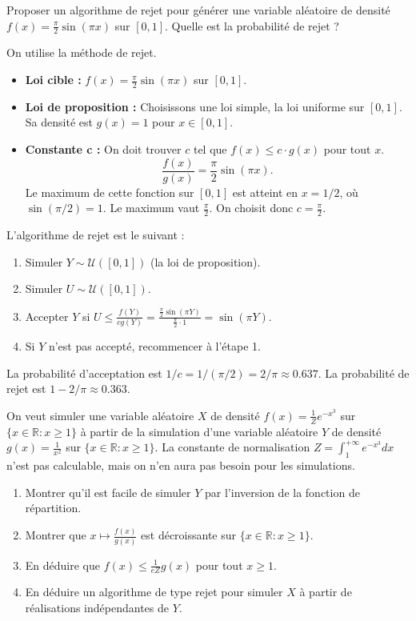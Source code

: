\documentclass[solutions]{exercices}
\begin{document}
\begin{exercice}
Proposer un algorithme de rejet pour générer une variable aléatoire de densité $f(x)=\frac{\pi}{2}\sin(\pi x)$ sur $[0,1]$.  Quelle est la probabilité de rejet ?
\end{exercice}

\begin{solution}
On utilise la méthode de rejet.
\begin{itemize}
    \item \textbf{Loi cible :} $f(x)=\frac{\pi}{2}\sin(\pi x)$ sur $[0,1]$.
    \item \textbf{Loi de proposition :} Choisissons une loi simple, la loi uniforme sur $[0,1]$. Sa densité est $g(x)=1$ pour $x \in [0,1]$.
    \item \textbf{Constante c :} On doit trouver $c$ tel que $f(x) \le c \cdot g(x)$ pour tout $x$.
    \[ \frac{f(x)}{g(x)} = \frac{\pi}{2}\sin(\pi x). \]
    Le maximum de cette fonction sur $[0,1]$ est atteint en $x=1/2$, où $\sin(\pi/2)=1$. Le maximum vaut $\frac{\pi}{2}$. On choisit donc $c=\frac{\pi}{2}$.
\end{itemize}
L'algorithme de rejet est le suivant :
\begin{enumerate}
    \item Simuler $Y \sim \mathcal{U}([0,1])$ (la loi de proposition).
    \item Simuler $U \sim \mathcal{U}([0,1])$.
    \item Accepter $Y$ si $U \le \frac{f(Y)}{c g(Y)} = \frac{\frac{\pi}{2}\sin(\pi Y)}{\frac{\pi}{2} \cdot 1} = \sin(\pi Y)$.
    \item Si $Y$ n'est pas accepté, recommencer à l'étape 1.
\end{enumerate}
La probabilité d'acceptation est $1/c = 1/(\pi/2) = 2/\pi \approx 0.637$.
La probabilité de rejet est $1 - 2/\pi \approx 0.363$.
\end{solution}

\begin{exercice}
On veut simuler une variable aléatoire $X$ de densité $f(x)=\frac{1}{Z}e^{-x^3}$ sur $\{x\in \mathbb{R}:x\geq 1\}$ à partir de la simulation d'une variable aléatoire $Y$ de densité $g(x)=\frac{1}{x^2}$ sur $\{x\in \mathbb{R}:x\geq 1\}$. La constante de normalisation $Z=\int_1^{+\infty}e^{-x^3}dx$ n'est pas calculable, mais on n'en aura pas besoin pour les simulations.
\begin{enumerate}
\item Montrer qu'il est facile de simuler $Y$ par l'inversion de la fonction de répartition.
\item Montrer que $x\mapsto \frac{f(x)}{g(x)}$ est décroissante sur $\{x\in \mathbb{R}:x\geq 1\}$.
\item En déduire que $f(x)\leq \frac{1}{eZ} g(x)$ pour tout $x\geq 1$.
\item En déduire un algorithme de type rejet pour simuler $X$ à partir de réalisations indépendantes de $Y$.
\end{enumerate}
\end{exercice}
\end{document}
